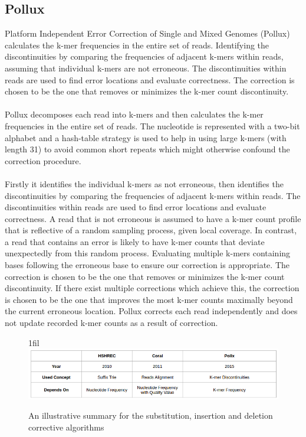 \documentclass[12pt,openany]{llncs}
\makeatletter
\newcommand*{\centerfloat}{%
  \parindent \z@
  \leftskip \z@ \@plus 1fil \@minus \textwidth
  \rightskip\leftskip
  \parfillskip \z@skip}
\makeatother
\begin{document}
\subsection{Pollux}
Platform Independent Error Correction of Single and Mixed Genomes (Pollux) \cite{Pollux} calculates the k-mer frequencies in the entire set of reads. Identifying the discontinuities by comparing the frequencies of adjacent k-mers within reads, assuming that individual k-mers are not erroneous. The discontinuities within reads are used to find error locations and evaluate correctness. The correction is chosen to be the one that removes or minimizes the k-mer count discontinuity.
\\
\\
Pollux decomposes each read into k-mers and then calculates the k-mer frequencies in the entire set of reads. The nucleotide is represented with a two-bit alphabet and a hash-table strategy is used to help in using large k-mers (with length 31) to avoid common short repeats which might otherwise confound the correction procedure.
\\
\\
Firstly it identifies the individual k-mers as not erroneous, then identifies the discontinuities by comparing the frequencies of adjacent k-mers within reads. The discontinuities within reads are used to find error locations and evaluate correctness. A read that is not erroneous is assumed to have a k-mer count profile that is reflective of a random sampling process, given local coverage. In contrast, a read that contains an error is likely to have k-mer counts that deviate unexpectedly from this random process. Evaluating multiple k-mers containing bases following the erroneous base to ensure our correction is appropriate. The correction is chosen to be the one that removes or minimizes the k-mer count discontinuity. If there exist multiple corrections which achieve this, the correction is chosen to be the one that improves the most k-mer counts maximally beyond the current erroneous location. Pollux corrects each read independently and does not update recorded k-mer counts as a result of correction.
 
\begin{figure}
	\centerfloat
	\includegraphics[width=1.35\linewidth]{./figs/RW-2}
	\caption{\label{fig:fig-RW-2}An illustrative summary for the substitution, insertion and deletion corrective algorithms}
\end{figure}
\end{document}
